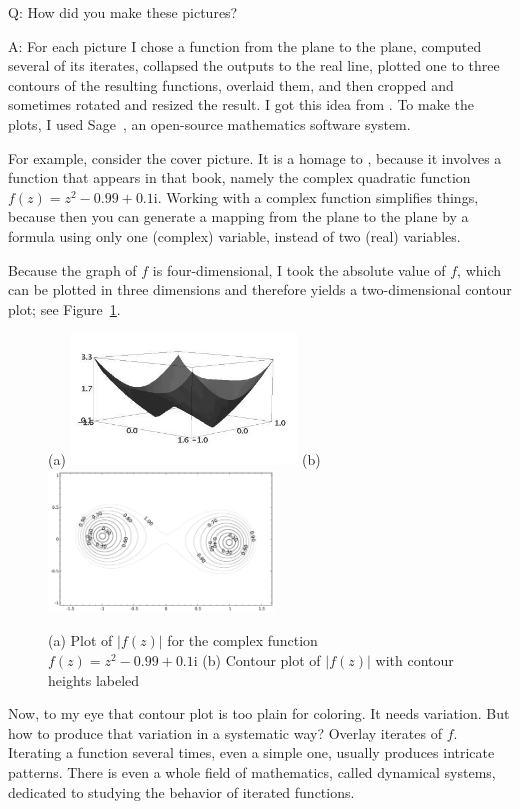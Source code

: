 \documentclass[12pt, a4paper]{amsart}
\newcommand{\mi}{\text{i}}  %
\begin{document}
Q: How did you make these pictures?

A: For each picture I chose a function from the plane to the plane, computed several of its iterates, collapsed the outputs to the real line, plotted one to three contours of the resulting functions, overlaid them, and then cropped and sometimes rotated and resized the result.
I got this idea from \cite{Hamp2009}.
To make the plots, I used Sage~\cite{Sage}, an open-source mathematics software system.

For example, consider the cover picture.
It is a homage to \cite{Hamp2009}, because it involves a function that appears in that book, namely the complex quadratic function $f(z) = z^2  - 0.99 + 0.1\mi$.
Working with a complex function simplifies things, because then you can  generate a mapping from the plane to the plane by a formula using only one (complex) variable, instead of two (real) variables.

Because the graph of $f$ is four-dimensional, I took the absolute value of $f$, which can be plotted in three dimensions and therefore yields a two-dimensional contour plot; see Figure~\ref{fig:3d}.

\begin{figure}[!ht]
(a) \includegraphics[width=60mm]{tutorial_3d.png}\qquad
(b) \includegraphics[width=60mm]{tutorial_contour.pdf}
\caption{
(a) Plot of $|f(z)|$ for the complex function $f(z) = z^2  - 0.99 + 0.1\mi$
(b) Contour plot of $|f(z)|$ with contour heights labeled
}
\label{fig:3d}
\end{figure}

Now, to my eye that contour plot is too plain for coloring.
It needs variation.
But how to produce that variation in a systematic way?
Overlay iterates of $f$. 
Iterating a function several times, even a simple one, usually produces intricate patterns.
There is even a whole field of mathematics, called dynamical systems, dedicated to studying the behavior of iterated functions.
\end{document}
